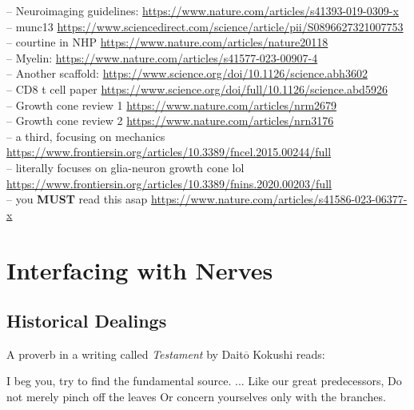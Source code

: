 -- Neuroimaging guidelines: \url{https://www.nature.com/articles/s41393-019-0309-x}\\
-- munc13 \url{https://www.sciencedirect.com/science/article/pii/S0896627321007753}\\
-- courtine in NHP \url{https://www.nature.com/articles/nature20118}\\
-- Myelin: \url{https://www.nature.com/articles/s41577-023-00907-4} \\
-- Another scaffold: \url{https://www.science.org/doi/10.1126/science.abh3602}\\
-- CD8 t cell paper \url{https://www.science.org/doi/full/10.1126/science.abd5926}\\
-- Growth cone review 1 \url{https://www.nature.com/articles/nrm2679} \\
-- Growth cone review 2 \url{https://www.nature.com/articles/nrn3176} \\
-- a third, focusing on mechanics \url{https://www.frontiersin.org/articles/10.3389/fncel.2015.00244/full} \\
-- literally focuses on glia-neuron growth cone lol \url{https://www.frontiersin.org/articles/10.3389/fnins.2020.00203/full} \\
-- you \textbf{MUST} read this asap \url{https://www.nature.com/articles/s41586-023-06377-x} 

\chapter{Interfacing with Nerves}


\section{Historical Dealings}

\label{sec:HistoricalDealings}

A proverb in a writing called \textit{Testament} by Dait$\overline{\mathrm{o}}$ Kokushi reads:\newline

\hspace*{1cm} I beg you, try to find the fundamental source.\newline
\hspace*{1cm} ...\newline
\hspace*{1cm} Like our great predecessors,\newline 
\hspace*{1cm} Do not merely pinch off the leaves\newline
\hspace*{1cm} Or concern yourselves only with the branches.\newline 

